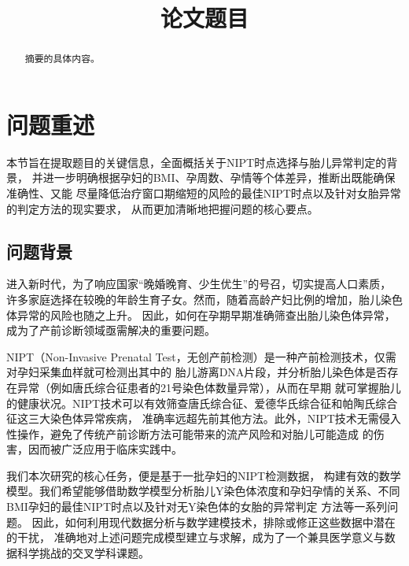 \documentclass{cumcmthesis}
\title{论文题目}
\begin{document}
        \maketitle
        \begin{abstract}
            摘要的具体内容。
        \end{abstract}
        \section{问题重述}
        本节旨在提取题目的关键信息，全面概括关于NIPT时点选择与胎儿异常判定的背景，
        并进一步明确根据孕妇的BMI、孕周数、孕情等个体差异，推断出既能确保准确性、又能
        尽量降低治疗窗口期缩短的风险的最佳NIPT时点以及针对女胎异常的判定方法的现实要求，
        从而更加清晰地把握问题的核心要点。

        \subsection{问题背景}
        
        进入新时代，为了响应国家“晚婚晚育、少生优生”的号召，切实提高人口素质，
        许多家庭选择在较晚的年龄生育子女。然而，随着高龄产妇比例的增加，胎儿染色体异常的风险也随之上升。
        因此，如何在孕期早期准确筛查出胎儿染色体异常，成为了产前诊断领域亟需解决的重要问题。
        \par 
        NIPT（Non-Invasive Prenatal Test，无创产前检测）是一种产前检测技术，仅需对孕妇采集血样就可检测出其中的
        胎儿游离DNA片段，并分析胎儿染色体是否存在异常（例如唐氏综合征患者的21号染色体数量异常），从而在早期
        就可掌握胎儿的健康状况。NIPT技术可以有效筛查唐氏综合征、爱德华氏综合征和帕陶氏综合征这三大染色体异常疾病，
        准确率远超先前其他方法。此外，NIPT技术无需侵入性操作，避免了传统产前诊断方法可能带来的流产风险和对胎儿可能造成
        的伤害，因而被广泛应用于临床实践中。
        \par 我们本次研究的核心任务，便是基于一批孕妇的NIPT检测数据，
        构建有效的数学模型。我们希望能够借助数学模型分析胎儿Y染色体浓度和孕妇孕情的关系、不同BMI孕妇的最佳NIPT时点以及针对无Y染色体的女胎的异常判定
        方法等一系列问题。
        因此，如何利用现代数据分析与数学建模技术，排除或修正这些数据中潜在的干扰，
        准确地对上述问题完成模型建立与求解，成为了一个兼具医学意义与数据科学挑战的交叉学科课题。
        
\end{document}
